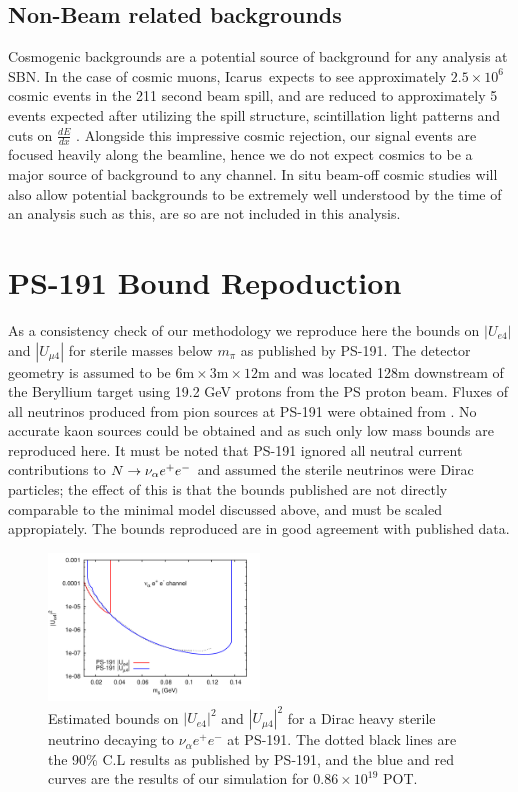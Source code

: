 \documentclass[11pt, a4paper]{article}
\def\icarus{Icarus}
\def\ster{\ensuremath N}
\begin{document}
\subsection{Non-Beam related backgrounds}
Cosmogenic backgrounds are a potential source of background for any analysis at SBN. In the case of cosmic muons, \icarus\ expects to
see approximately $2.5 \times 10^{6}$ cosmic events in the 211 second beam
spill, and are reduced to approximately 5 events expected after utilizing the
spill structure, scintillation light patterns and cuts on $\frac{d E}{d x}$
\cite{Antonello:2015lea}.  Alongside this impressive cosmic rejection, our
signal events are focused heavily along the beamline, hence we do not expect
cosmics to be a major source of background to any channel. In situ beam-off
cosmic studies will also allow potential backgrounds to be extremely well
understood by the time of an analysis such as this, are so are not included in
this analysis. 

\section{PS-191 Bound Repoduction\label{sec:ps191}}

As a consistency check of our methodology we reproduce here the bounds on
$|U_{e4}|$ and $|U_{\mu 4}|$ for sterile masses below $m_\pi$ as published by
PS-191. The detector geometry is assumed to be $6\text{m} \times 3\text{m}
\times 12 \text{m}$ and was located 128m downstream of the Beryllium target
using 19.2 GeV protons from the PS proton beam.  Fluxes of all neutrinos
produced from pion sources at PS-191 were obtained from \cite{ps191THesis}. No
accurate kaon sources could be obtained and as such only low mass bounds are
reproduced here. It must be noted that PS-191 ignored all neutral current
contributions to $\ster \rightarrow \nu_\alpha e^+ e^-$ and assumed the sterile
neutrinos were Dirac particles; the effect of this is that the bounds published
are not directly comparable to the minimal model discussed above, and must be
scaled appropiately. The bounds reproduced are in good agreement with published
data.

\begin{figure}
			  \centering
			 
\includegraphics[width=0.5\textwidth]{figures/PS-191_test.pdf}

\caption{\label{fig:ps191test} Estimated bounds on $|U_{e4}|^2$ and $|U_{\mu
4}|^2$ for a Dirac heavy sterile neutrino decaying to $\nu_\alpha e^+ e^-$ at
PS-191. The dotted black lines are the 90\% C.L results as published by PS-191,
and the blue and red curves are the results of our simulation for $0.86 \times
10^{19}$ POT.}

\end{figure}
\end{document}
